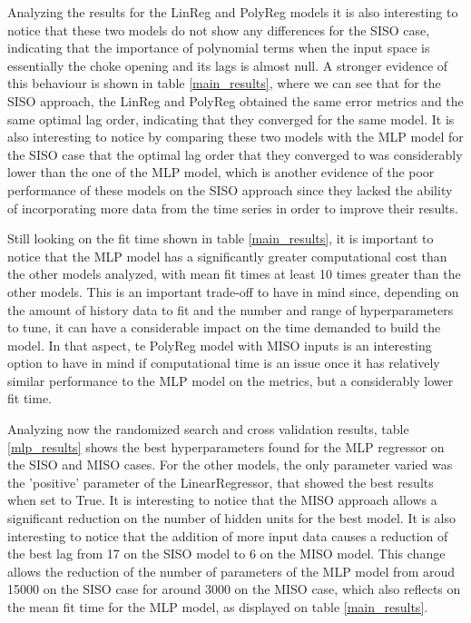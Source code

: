 \documentclass[conference]{IEEEtran}
\begin{document}
Analyzing the results for the LinReg and PolyReg models it is also interesting to notice that these two models do not show any differences for the SISO case, indicating that the importance of polynomial terms when the input space is essentially the choke opening and its lags is almost null. A stronger evidence of this behaviour is shown in table \ref{main_results}, where we can see that for the SISO approach, the LinReg and PolyReg obtained the same error metrics and the same optimal lag order, indicating that they converged for the same model. It is also interesting to notice by comparing these two models with the MLP model for the SISO case that the optimal lag order that they converged to was considerably lower than the one of the MLP model, which is another evidence of the poor performance of these models on the SISO approach since they lacked the ability of incorporating more data from the time series in order to improve their results.

Still looking on the fit time shown in table \ref{main_results}, it is important to notice that the MLP model has a significantly greater computational cost than the other models analyzed, with mean fit times at least 10 times greater than the other models. This is an important trade-off to have in mind since, depending on the amount of history data to fit and the number and range of hyperparameters to tune, it can have a considerable impact on the time demanded to build the model. In that aspect, te PolyReg model with MISO inputs is an interesting option to have in mind if computational time is an issue once it has relatively similar performance to the MLP model on the metrics, but a considerably lower fit time.

Analyzing now the randomized search and cross validation results, table \ref{mlp_results} shows the best hyperparameters found for the MLP regressor on the SISO and MISO cases. For the other models, the only parameter varied was the 'positive' parameter of the LinearRegressor, that showed the best results when set to True. It is interesting to notice that the MISO approach allows a significant reduction on the number of hidden units for the best model. It is also interesting to notice that the addition of more input data causes a reduction of the best lag from 17 on the SISO model to 6 on the MISO model. This change allows the reduction of the number of parameters of the MLP model from aroud 15000 on the SISO case for around 3000 on the MISO case, which also reflects on the mean fit time for the MLP model, as displayed on table \ref{main_results}.
\end{document}
